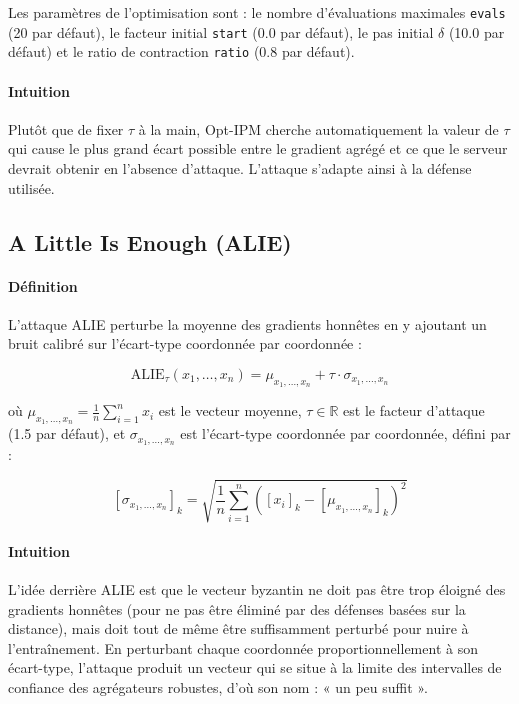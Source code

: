 \documentclass[a4paper,11pt]{article}
\begin{document}
Les paramètres de l'optimisation sont : le nombre d'évaluations maximales \texttt{evals} (20 par défaut), le facteur initial \texttt{start} (0.0 par défaut), le pas initial $\delta$ (10.0 par défaut) et le ratio de contraction \texttt{ratio} (0.8 par défaut).

\paragraph{Intuition}

Plutôt que de fixer $\tau$ à la main, Opt-IPM cherche automatiquement la valeur de $\tau$ qui cause le plus grand écart possible entre le gradient agrégé et ce que le serveur devrait obtenir en l'absence d'attaque. L'attaque s'adapte ainsi à la défense utilisée.

\subsection{A Little Is Enough (ALIE)}

\paragraph{Définition}

L'attaque ALIE perturbe la moyenne des gradients honnêtes en y ajoutant un bruit calibré sur l'écart-type coordonnée par coordonnée :

\[
\mathrm{ALIE}_\tau(x_1,\dots,x_n) = \mu_{x_1,\dots,x_n} + \tau \cdot \sigma_{x_1,\dots,x_n}
\]

où $\mu_{x_1,\dots,x_n} = \frac{1}{n}\sum_{i=1}^n x_i$ est le vecteur moyenne, $\tau \in \mathbb{R}$ est le facteur d'attaque (1.5 par défaut), et $\sigma_{x_1,\dots,x_n}$ est l'écart-type coordonnée par coordonnée, défini par :

\[
\left[\sigma_{x_1,\dots,x_n}\right]_k = \sqrt{\frac{1}{n}\sum_{i=1}^{n}\left(\left[x_i\right]_k - \left[\mu_{x_1,\dots,x_n}\right]_k\right)^2}
\]

\paragraph{Intuition}

L'idée derrière ALIE est que le vecteur byzantin ne doit pas être trop éloigné des gradients honnêtes (pour ne pas être éliminé par des défenses basées sur la distance), mais doit tout de même être suffisamment perturbé pour nuire à l'entraînement. En perturbant chaque coordonnée proportionnellement à son écart-type, l'attaque produit un vecteur qui se situe à la limite des intervalles de confiance des agrégateurs robustes, d'où son nom : « un peu suffit ».
\end{document}

